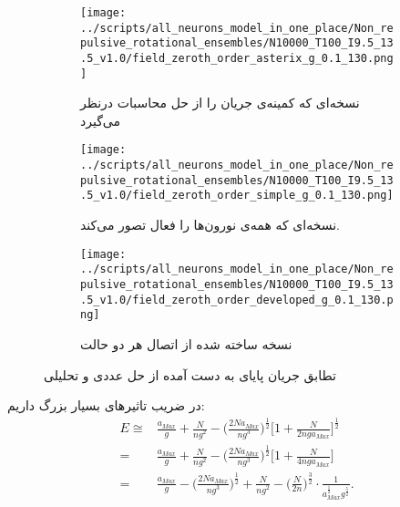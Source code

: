 \begin{figure}
	\centering
	\begin{subfigure}[b]{0.7\textwidth}
		\centering
		\texttt{[image: ../scripts/all\_neurons\_model\_in\_one\_place/Non\_repulsive\_rotational\_ensembles/N10000\_T100\_I9.5\_13.5\_v1.0/field\_zeroth\_order\_asterix\_g\_0.1\_130.png]}
		\caption{نسخه‌ای که کمینه‌ی جریان را از حل محاسبات درنظر می‌گیرد}
		\label{fig:e_zeroth_not_all_gifted}
	\end{subfigure}
	\hfill
	\begin{subfigure}[b]{0.7\textwidth}
		\centering
		\texttt{[image: ../scripts/all\_neurons\_model\_in\_one\_place/Non\_repulsive\_rotational\_ensembles/N10000\_T100\_I9.5\_13.5\_v1.0/field\_zeroth\_order\_simple\_g\_0.1\_130.png]}
		\caption{نسخه‌ای که همه‌ی نورون‌ها را فعال تصور می‌کند.}
		\label{fig:e_zeroth_all_gifted}
	\end{subfigure}
	\hfill
	\begin{subfigure}[b]{0.7\textwidth}
		\centering
		\texttt{[image: ../scripts/all\_neurons\_model\_in\_one\_place/Non\_repulsive\_rotational\_ensembles/N10000\_T100\_I9.5\_13.5\_v1.0/field\_zeroth\_order\_developed\_g\_0.1\_130.png]}
		\caption{نسخه ساخته شده از اتصال هر دو حالت}
		\label{fig:e_zeroth_developed}
	\end{subfigure}
	\caption{تطابق جریان پایای به دست آمده از حل عددی و تحلیلی}
	\label{fig:three graphs}
\end{figure}

در ضریب تاثیرهای بسیار بزرگ داریم:
\begin{align}
	E \cong & \frac{a_{Max}}{g} + \frac{N}{ng^2} - \bigg(\frac{2N a_{Max}}{n g^3}\bigg)^{\frac{1}{2}} \bigg[ 1 + \frac{N}{2nga_{Max}} \bigg]^{\frac{1}{2}}\\
	=& \frac{a_{Max}}{g} + \frac{N}{ng^2} - \bigg(\frac{2 N a_{Max}}{n g^3}\bigg)^{\frac{1}{2}} \bigg[ 1 + \frac{N}{4nga_{Max}} \bigg]\\
	=& \frac{a_{Max}}{g} - \bigg(\frac{2 N a_{Max}}{n g^3}\bigg)^{\frac{1}{2}} + \frac{N}{ng^2}  - \bigg(\frac{N}{2n}\bigg)^{\frac{3}{2}}  \cdot \frac{1}{ {a^{\frac{1}{2}}_{Max} g^{\frac{5}{2}}}}.
\end{align}


